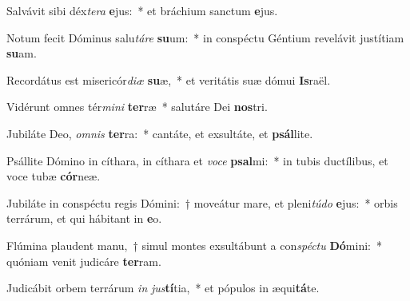 \item Salvávit sibi déx\textit{te}\textit{ra} \textbf{e}jus:~* et bráchium sanctum \textbf{e}jus.
\item Notum fecit Dóminus salu\textit{tá}\textit{re} \textbf{su}um:~* in conspéctu Géntium revelávit justítiam \textbf{su}am.
\item Recordátus est misericór\textit{di}\textit{æ} \textbf{su}æ,~* et veritátis suæ dómui \textbf{Is}raël.
\item Vidérunt omnes tér\textit{mi}\textit{ni} \textbf{ter}ræ~* salutáre Dei \textbf{nos}tri.
\item Jubiláte Deo, \textit{om}\textit{nis} \textbf{ter}ra:~* cantáte, et exsultáte, et \textbf{psál}lite.
\item Psállite Dómino in cíthara, in cíthara et \textit{vo}\textit{ce} \textbf{psal}mi:~* in tubis ductílibus, et voce tubæ \textbf{cór}neæ.
\item Jubiláte in conspéctu regis Dómini:~† moveátur mare, et pleni\textit{tú}\textit{do} \textbf{e}jus:~* orbis terrárum, et qui hábitant in \textbf{e}o.
\item Flúmina plaudent manu,~† simul montes exsultábunt a con\textit{spéc}\textit{tu} \textbf{Dó}mini:~* quóniam venit judicáre \textbf{ter}ram.
\item Judicábit orbem terrárum \textit{in} \textit{jus}\textbf{tí}tia,~* et pópulos in æqui\textbf{tá}te.
